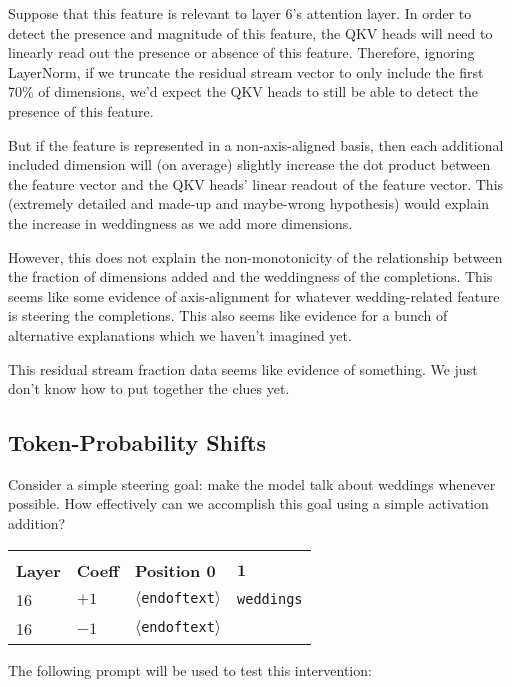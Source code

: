 \documentclass[10pt]{article}
\newcommand{\eot}{$\langle$\textbar endoftext\textbar$\rangle$}
\begin{document}
Suppose that this feature is relevant to layer 6's attention layer. In order to detect the presence and magnitude of this feature, the QKV heads will need to linearly read out the presence or absence of this feature. Therefore, ignoring LayerNorm, if we truncate the residual stream vector to only include the first 70\% of dimensions, we'd expect the QKV heads to still be able to detect the presence of this feature. 

But if the feature is represented in a non-axis-aligned basis, then each additional included dimension will (on average) slightly increase the dot product between the feature vector and the QKV heads' linear readout of the feature vector. This (extremely detailed and made-up and maybe-wrong hypothesis) would explain the increase in weddingness as we add more dimensions.  

However, this does not explain the non-monotonicity of the relationship between the fraction of dimensions added and the weddingness of the completions. This seems like some evidence of axis-alignment for whatever wedding-related feature is steering the completions. This also seems like evidence for a bunch of alternative explanations which we haven't imagined yet. 

This residual stream fraction data seems like evidence of something. We just don't know how to put together the clues yet. 

\subsection{Token-Probability Shifts}
Consider a simple steering goal: make the model talk about weddings whenever possible. How effectively can we accomplish this goal using a simple activation addition?


\begin{table*}[h]
\centering
\begin{tabularx}{\linewidth}{XXXX}
	\rowcolor{gray!20} \multicolumn{4}{c}{\textbf{Residual Stream Alignment for Activation Additions}} \\
	\rowcolor{gray!20} \textbf{Layer}&\textbf{Coeff}&\textbf{Position $\mathbf{0}$}&$\mathbf{1}$ \\
	16&$+1$&\texttt{\eot}&{\textvisiblespace}\texttt{weddings} \\
	16&$-1$&\texttt{\eot}&\textvisiblespace
\end{tabularx}
\end{table*}


The following prompt will be used to test this intervention:
\end{document}
